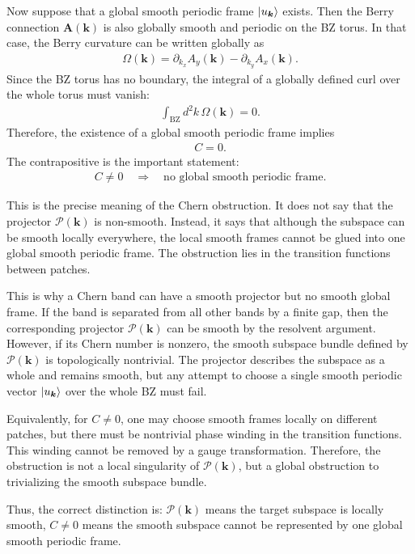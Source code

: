 \documentclass[12pt, oneside]{article}
\newcommand{\mr}[1]{\mathrm{#1}}
\newcommand{\p}[1]{\left(#1\right)}
\numberwithin{equation}{subsection}
\begin{document}
Now suppose that a global smooth periodic frame \(\ket{u_{\bm{k}}}\) exists. Then the Berry connection \(\bm{A}\p{\bm{k}}\) is also globally smooth and periodic on the BZ torus. In that case, the Berry curvature can be written globally as
\begin{align}
	\Omega\p{\bm{k}}=\partial_{k_x}A_y\p{\bm{k}}-\partial_{k_y}A_x\p{\bm{k}}.
\end{align}
Since the BZ torus has no boundary, the integral of a globally defined curl over the whole torus must vanish:
\begin{align}
	\int_{\mr{BZ}}d^2k\,\Omega\p{\bm{k}}=0.
\end{align}
Therefore, the existence of a global smooth periodic frame implies
\begin{align}
	C=0.
\end{align}
The contrapositive is the important statement:
\begin{align*}
	C\neq0 \quad \Longrightarrow \quad \text{no global smooth periodic frame}.
\end{align*}

This is the precise meaning of the Chern obstruction. It does not say that the projector \(\mathcal{P}\p{\bm{k}}\) is non-smooth. Instead, it says that although the subspace can be smooth locally everywhere, the local smooth frames cannot be glued into one global smooth periodic frame. The obstruction lies in the transition functions between patches.

This is why a Chern band can have a smooth projector but no smooth global frame. If the band is separated from all other bands by a finite gap, then the corresponding projector \(\mathcal{P}\p{\bm{k}}\) can be smooth by the resolvent argument. However, if its Chern number is nonzero, the smooth subspace bundle defined by \(\mathcal{P}\p{\bm{k}}\) is topologically nontrivial. The projector describes the subspace as a whole and remains smooth, but any attempt to choose a single smooth periodic vector \(\ket{u_{\bm{k}}}\) over the whole BZ must fail.

Equivalently, for \(C\neq0\), one may choose smooth frames locally on different patches, but there must be nontrivial phase winding in the transition functions. This winding cannot be removed by a gauge transformation. Therefore, the obstruction is not a local singularity of \(\mathcal{P}\p{\bm{k}}\), but a global obstruction to trivializing the smooth subspace bundle.

Thus, the correct distinction is: \(\mathcal{P}\p{\bm{k}}\) means the target subspace is locally smooth, \(C \neq 0\) means the smooth subspace cannot be represented by one global smooth periodic frame.
\end{document}
